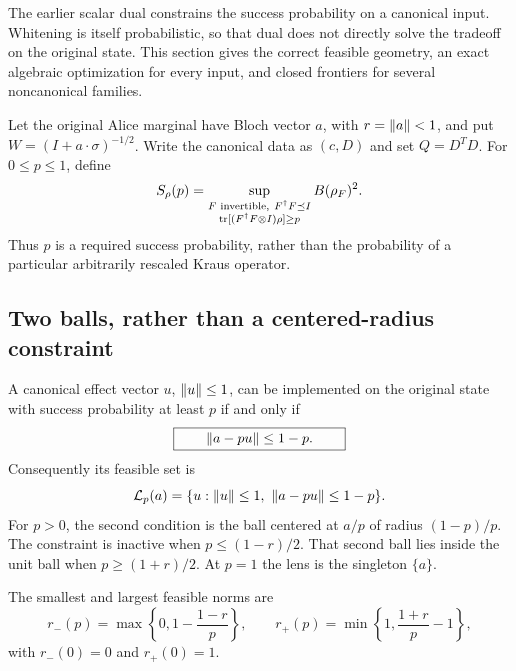 The earlier scalar dual constrains the success probability on a canonical
input. Whitening is itself probabilistic, so that dual does not directly
solve the tradeoff on the original state. This section gives the correct
feasible geometry, an exact algebraic optimization for every input, and
closed frontiers for several noncanonical families.

Let the original Alice marginal have Bloch vector $a$, with
$r=\left\lVert a\right\rVert<1$, and put $W=(I+a\cdot\sigma)^{-1/2}$.
Write the canonical data as $(c,D)$ and set $Q=D^TD$.
For $0\le p\le1$, define
\[
 S_\rho(p)=
 \sup_{\substack{F\text{ invertible},\ F^\dagger F\preceq I\\
                  \operatorname{tr}[(F^\dagger F\otimes I)\rho]\ge p}}
 B(\rho_F)^2.
\]
Thus $p$ is a required success probability, rather than the probability
of a particular arbitrarily rescaled Kraus operator.

\subsection{Two balls, rather than a centered-radius constraint}

\begin{theorem}
\label{thm:r3-lens}
A canonical effect vector $u$, $\left\lVert u\right\rVert\le1$, can be implemented on the
original state with success probability at least $p$ if and only if
\begin{equation}
 \boxed{\qquad \left\lVert a-pu\right\rVert\le1-p.\qquad}
 \label{eq:r3-lens}
\end{equation}
Consequently its feasible set is
\begin{equation}
 \mathcal L_p(a)=
 \{u:\left\lVert u\right\rVert\le1,\ \left\lVert a-pu\right\rVert\le1-p\}.
 \label{eq:r3-lens-set}
\end{equation}
For $p>0$, the second condition is the ball centered at $a/p$ of
radius $(1-p)/p$. The constraint is inactive when
$p\le(1-r)/2$. That second ball lies inside the unit ball when
$p\ge(1+r)/2$. At $p=1$ the lens is the singleton $\{a\}$.

The smallest and largest feasible norms are
\begin{equation}
 r_-(p)=\max\left\{0,1-\frac{1-r}{p}\right\},\qquad
 r_+(p)=\min\left\{1,\frac{1+r}{p}-1\right\},
 \label{eq:r3-radius-range}
\end{equation}
with $r_-(0)=0$ and $r_+(0)=1$.
\end{theorem}

